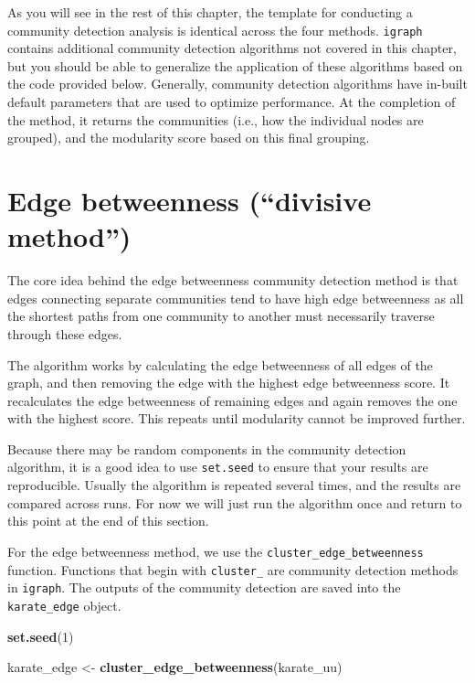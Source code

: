 \documentclass[
]{book}
\newenvironment{Shaded}{\begin{snugshade}}{\end{snugshade}}
\newcommand{\DecValTok}[1]{\textcolor[rgb]{0.00,0.00,0.81}{#1}}
\newcommand{\FunctionTok}[1]{\textcolor[rgb]{0.13,0.29,0.53}{\textbf{#1}}}
\newcommand{\NormalTok}[1]{#1}
\newcommand{\OtherTok}[1]{\textcolor[rgb]{0.56,0.35,0.01}{#1}}
\begin{document}
As you will see in the rest of this chapter, the template for conducting a community detection analysis is identical across the four methods. \texttt{igraph} contains additional community detection algorithms not covered in this chapter, but you should be able to generalize the application of these algorithms based on the code provided below. Generally, community detection algorithms have in-built default parameters that are used to optimize performance. At the completion of the method, it returns the communities (i.e., how the individual nodes are grouped), and the modularity score based on this final grouping.

\section{Edge betweenness (``divisive method'')}\label{edge-betweenness-divisive-method}

The core idea behind the edge betweenness community detection method is that edges connecting separate communities tend to have high edge betweenness as all the shortest paths from one community to another must necessarily traverse through these edges.

The algorithm works by calculating the edge betweenness of all edges of the graph, and then removing the edge with the highest edge betweenness score. It recalculates the edge betweenness of remaining edges and again removes the one with the highest score. This repeats until modularity cannot be improved further.

Because there may be random components in the community detection algorithm, it is a good idea to use \texttt{set.seed} to ensure that your results are reproducible. Usually the algorithm is repeated several times, and the results are compared across runs. For now we will just run the algorithm once and return to this point at the end of this section.

For the edge betweenness method, we use the \texttt{cluster\_edge\_betweenness} function. Functions that begin with \texttt{cluster\_} are community detection methods in \texttt{igraph}. The outputs of the community detection are saved into the \texttt{karate\_edge} object.

\begin{Shaded}
\begin{Highlighting}[]
\FunctionTok{set.seed}\NormalTok{(}\DecValTok{1}\NormalTok{)}

\NormalTok{karate\_edge }\OtherTok{\textless{}{-}} \FunctionTok{cluster\_edge\_betweenness}\NormalTok{(karate\_uu)}
\end{Highlighting}
\end{Shaded}
\end{document}
